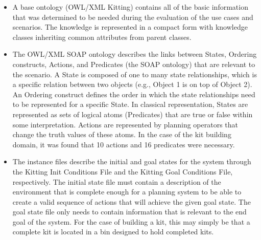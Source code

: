 \begin{itemize}
\item A base ontology (\textsf{OWL/XML Kitting})
contains all of the basic information that was determined to be needed
during the evaluation of the use cases and scenarios. The knowledge is
represented in a compact form with knowledge classes
inheriting common attributes from parent classes.
\item The \textsf{OWL/XML SOAP} ontology describes the links between States, Ordering constructs, Actions, and Predicates (the SOAP
ontology) that are relevant to the scenario. A State is composed of one to many state relationships, which is
a specific relation between two objects (e.g., Object 1 is on top of Object 2). An Ordering construct defines the order in which the state relationships need to be
represented for a specific State. In classical representation, States are represented as sets of logical
atoms (Predicates) that are true or false within some interpretation. Actions are represented by
planning operators that change the truth values of these atoms. In the case of the kit building domain, it was found that 10 actions and
16 predicates were necessary.

\item The instance files describe the initial and goal states for the
system through the \textsf{Kitting Init Conditions File} and the
\textsf{Kitting Goal Conditions File}, respectively. The initial state file
must contain a description of the environment that is complete enough for a
planning system to be able to create a valid sequence of actions that will
achieve the given goal state. The goal state file only needs to contain
information that is relevant to the end goal of the system. For the case of building a kit, this may simply be that a complete kit is located in a bin designed to hold completed kits.

\end{itemize}







